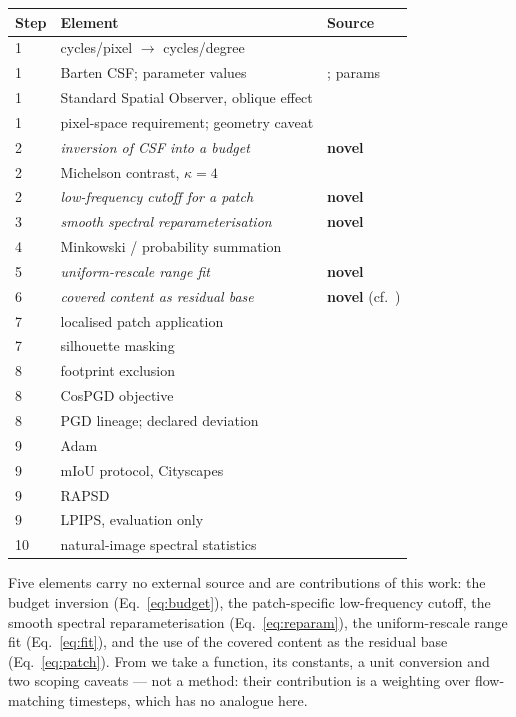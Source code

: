 \begin{tabular}{lll}
\textbf{Step} & \textbf{Element} & \textbf{Source} \\
\hline
1 & cycles/pixel $\to$ cycles/degree & \citep[App.~D]{galinska2026csflow} \\
1 & Barten CSF; parameter values & \citep{barten2003}; params \citep[App.~A]{galinska2026csflow} \\
1 & Standard Spatial Observer, oblique effect & \citep{watson2005sso} \\
1 & pixel-space requirement; geometry caveat & \citep[Sec.~5.1, 6]{galinska2026csflow} \\
2 & \emph{inversion of CSF into a budget} & \textbf{novel} \\
2 & Michelson contrast, $\kappa=4$ & \citep{michelson1927} \\
2 & \emph{low-frequency cutoff for a patch} & \textbf{novel} \\
3 & \emph{smooth spectral reparameterisation} & \textbf{novel} \\
4 & Minkowski / probability summation & \citep{quick1974,robson1981,watson1979} \\
5 & \emph{uniform-rescale range fit} & \textbf{novel} \\
6 & \emph{covered content as residual base} & \textbf{novel} (cf.\ \citep{tan2021lap}) \\
7 & localised patch application & \citep{brown2017patch} \\
7 & silhouette masking & \citep{tan2021lap} \\
8 & footprint exclusion & \citep{mirsky2023ipatch} \\
8 & CosPGD objective & \citep{agnihotri2024cospgd} \\
8 & PGD lineage; declared deviation & \citep{madry2018pgd} \\
9 & Adam & \citep{kingma2015adam} \\
9 & mIoU protocol, Cityscapes & \citep{cordts2016cityscapes} \\
9 & RAPSD & \citep{ruzanski2011rapsd} \\
9 & LPIPS, evaluation only & \citep{zhang2018lpips} \\
10 & natural-image spectral statistics & \citep{falck2025fourier,dieleman2024spectral} \\
\end{tabular}

\medskip
\noindent
Five elements carry no external source and are contributions of this
work: the budget inversion (Eq.~\ref{eq:budget}), the patch-specific
low-frequency cutoff, the smooth spectral reparameterisation
(Eq.~\ref{eq:reparam}), the uniform-rescale range fit
(Eq.~\ref{eq:fit}), and the use of the covered content as the residual
base (Eq.~\ref{eq:patch}). From \citet{galinska2026csflow} we take a
function, its constants, a unit conversion and two scoping caveats ---
not a method: their contribution is a weighting over flow-matching
timesteps, which has no analogue here.
